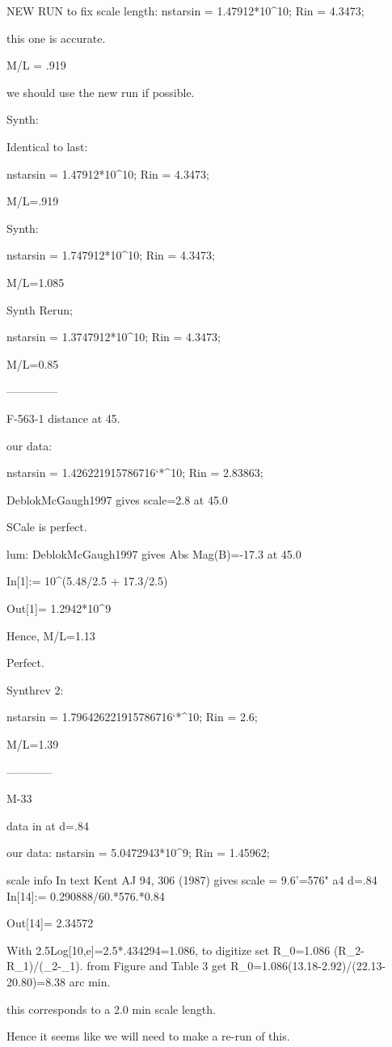 NEW RUN to fix scale length:
nstarsin = 1.47912*10^10;
Rin = 4.3473;

this one is accurate.

M/L = .919

we should use the new run if possible.

Synth:

Identical to last:

nstarsin = 1.47912*10^10;
Rin = 4.3473;

M/L=.919

Synth:

nstarsin = 1.747912*10^10;
Rin = 4.3473;

M/L=1.085

Synth Rerun;

nstarsin = 1.3747912*10^10;
Rin = 4.3473;

M/L=0.85

--------------

F-563-1
distance at 45.

our data:

nstarsin = 1.426221915786716`*^10;
Rin = 2.83863;

DeblokMcGaugh1997 gives scale=2.8 at 45.0

SCale is perfect.

lum: DeblokMcGaugh1997 gives Abs Mag(B)=-17.3 at 45.0

In[1]:= 10^(5.48/2.5 + 17.3/2.5)

Out[1]= 1.2942*10^9

Hence, M/L=1.13

Perfect.

Synthrev 2:

nstarsin = 1.796426221915786716`*^10;
Rin = 2.6;

M/L=1.39

------------

M-33

data in at d=.84

our data:
nstarsin = 5.0472943*10^9;
Rin = 1.45962;

scale info In text Kent AJ 94, 306 (1987)  gives scale = 9.6'=576" a4 d=.84
In[14]:= 0.290888/60.*576.*0.84

Out[14]= 2.34572

With 2.5Log[10,e]=2.5*.434294=1.086, to digitize set R_0=1.086
(R_2-R_1)/(\mu_2-\mu_1).
from Figure and Table 3 get  R_0=1.086(13.18-2.92)/(22.13-20.80)=8.38 arc
min.

this corresponds to a 2.0 min scale length.

Hence it seems like we will need to make a re-run of this.

